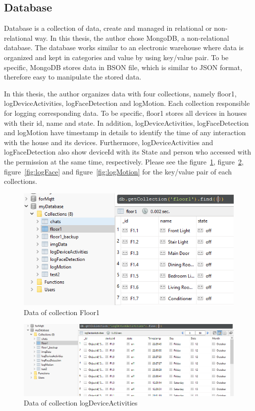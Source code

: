     \subsection{Database}
    Database is a collection of data, create and managed in relational or non-relational way. In this thesis, the author chose MongoDB, a non-relational database. The database works similar to an electronic warehouse where data is organized and kept in categories and value by using key/value pair. To be specific, MongoDB stores data in BSON file, which is similar to JSON format, therefore easy to manipulate the stored data.

    In this thesis, the author organizes data with four collections, namely floor1, logDeviceActivities, logFaceDetection and logMotion. Each collection responsible for logging corresponding data. To be specific, floor1 stores all devices in houses with their id, name and state. In addition, logDeviceActivities, logFaceDetection and logMotion have timestamp in details to identify the time of any interaction with the house and its devices. Furthermore, logDeviceActivities and logFaceDetection also show deviceId with its State and person who accessed with the permission at the same time, respectively. Please see the figure~\ref{fig:floor1}, figure~\ref{fig:logDevice}, figure~\ref{fig:logFace} and figure~\ref{fig:logMotion} for the key/value pair of each collections.
    \begin{figure}[!ht]
        \begin{center}
        \includegraphics[scale=0.8]{images/floor1.png}
        \caption{Data of collection Floor1}
        \label{fig:floor1}
        \end{center}
    \end{figure}
    \begin{figure}[!ht]
        \begin{center}
        \includegraphics[scale=0.55]{images/logDevice.png}
        \caption{Data of collection logDeviceActivities}
        \label{fig:logDevice}
        \end{center}
    \end{figure}

